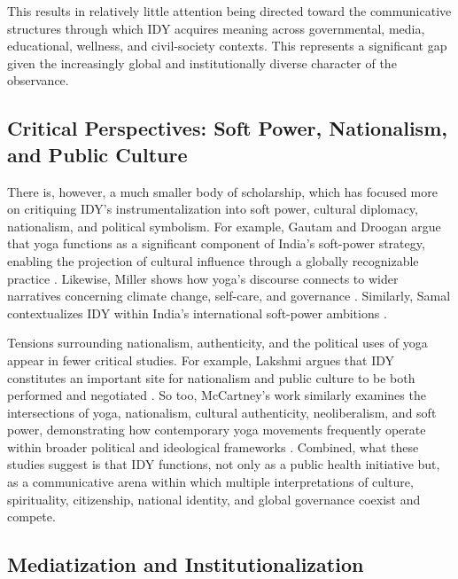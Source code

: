 \documentclass[11pt]{article}
\begin{document}
This results in relatively little attention being directed toward the communicative structures through which IDY acquires meaning across governmental, media, educational, wellness, and civil-society contexts. This represents a significant gap given the increasingly global and institutionally diverse character of the observance.


\subsection{Critical Perspectives: Soft Power, Nationalism, and Public Culture}

There is, however, a much smaller body of scholarship, which has focused more on critiquing IDY's instrumentalization into soft power, cultural diplomacy, nationalism, and political symbolism. For example, Gautam and Droogan argue that yoga functions as a significant component of India's soft-power strategy, enabling the projection of cultural influence through a globally recognizable practice \cite{gautam2018}. Likewise, Miller shows how yoga's discourse connects to wider narratives concerning climate change, self-care, and governance \cite{miller2020}. Similarly, Samal contextualizes IDY within India's international soft-power ambitions \cite{samal2020}. 

Tensions surrounding nationalism, authenticity, and the political uses of yoga appear in fewer critical studies. For example, Lakshmi argues that IDY constitutes an important site for nationalism and public culture to be both performed and negotiated \cite{lakshmi2020}. So too, McCartney's work similarly examines the intersections of yoga, nationalism, cultural authenticity, neoliberalism, and soft power, demonstrating how contemporary yoga movements frequently operate within broader political and ideological frameworks \cite{mccartney2018,mccartney2019a,mccartney2019b,mccartney2025,mccartney2026}. Combined, what these studies suggest is that IDY functions, not only as a public health initiative but, as a communicative arena within which multiple interpretations of culture, spirituality, citizenship, national identity, and global governance coexist and compete.


\subsection{Mediatization and Institutionalization}
\end{document}
